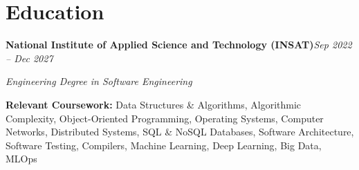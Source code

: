\section{Education}

\begin{onecolentry}
    \textbf{National Institute of Applied Science and Technology (INSAT)}\hfill\textit{Sep 2022 – Dec 2027}

    \textit{Engineering Degree in Software Engineering}

    {\footnotesize \textbf{Relevant Coursework:} Data Structures \& Algorithms, Algorithmic Complexity, Object-Oriented Programming, Operating Systems, Computer Networks, Distributed Systems, SQL \& NoSQL Databases, Software Architecture, Software Testing, Compilers, Machine Learning, Deep Learning, Big Data, MLOps}%
\end{onecolentry}
